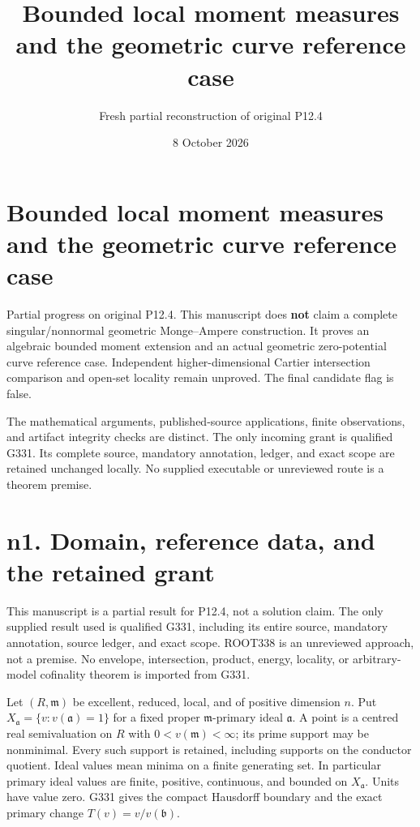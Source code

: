 \documentclass[
  11pt,
]{article}
\title{Bounded local moment measures and the geometric curve reference
case}
\author{Fresh partial reconstruction of original P12.4}
\date{8 October 2026}
\begin{document}
\maketitle

{
\setcounter{tocdepth}{3}
\tableofcontents
}
\section{Bounded local moment measures and the geometric curve reference
case}\label{bounded-local-moment-measures-and-the-geometric-curve-reference-case}

Partial progress on original P12.4. This manuscript does \textbf{not}
claim a complete singular/nonnormal geometric Monge--Ampere
construction. It proves an algebraic bounded moment extension and an
actual geometric zero-potential curve reference case. Independent
higher-dimensional Cartier intersection comparison and open-set locality
remain unproved. The final candidate flag is false.

The mathematical arguments, published-source applications, finite
observations, and artifact integrity checks are distinct. The only
incoming grant is qualified G331. Its complete source, mandatory
annotation, ledger, and exact scope are retained unchanged locally. No
supplied executable or unreviewed route is a theorem premise.

\section{n1. Domain, reference data, and the retained
grant}\label{n1.-domain-reference-data-and-the-retained-grant}

This manuscript is a partial result for P12.4, not a solution claim. The
only supplied result used is qualified G331, including its entire
source, mandatory annotation, source ledger, and exact scope. ROOT338 is
an unreviewed approach, not a premise. No envelope, intersection,
product, energy, locality, or arbitrary-model cofinality theorem is
imported from G331.

Let \((R,\mathfrak m)\) be excellent, reduced, local, and of positive
dimension \(n\). Put \(X_{\mathfrak a}=\{v:v(\mathfrak a)=1\}\) for a
fixed proper \(\mathfrak m\)-primary ideal \(\mathfrak a\). A point is a
centred real semivaluation on \(R\) with \(0<v(\mathfrak m)<\infty\);
its prime support may be nonminimal. Every such support is retained,
including supports on the conductor quotient. Ideal values mean minima
on a finite generating set. In particular primary ideal values are
finite, positive, continuous, and bounded on \(X_{\mathfrak a}\). Units
have value zero. G331 gives the compact Hausdorff boundary and the exact
primary change \(T(v)=v/v(\mathfrak b)\).
\end{document}
